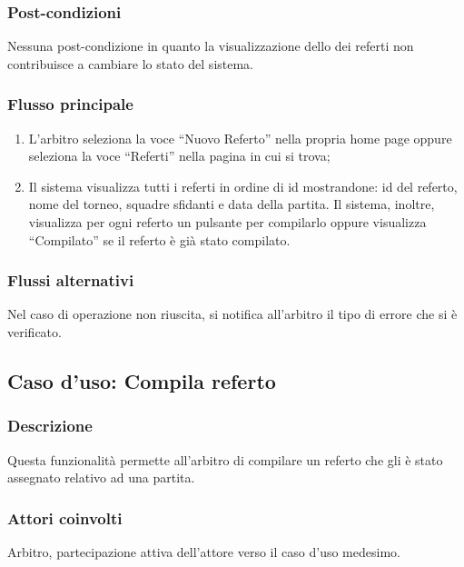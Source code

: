 \subsubsection*{Post-condizioni}
Nessuna post-condizione in quanto la visualizzazione dello dei referti non contribuisce a cambiare lo stato del sistema.

\subsubsection*{Flusso principale}

\begin{enumerate}
	
	\item
	L'arbitro seleziona la voce ``Nuovo Referto'' nella propria home page oppure seleziona la voce ``Referti'' nella pagina in cui si trova;
	
	\item
	Il sistema visualizza tutti i referti in ordine di id mostrandone: id del referto, nome del torneo, squadre sfidanti e data della partita. Il sistema, inoltre, visualizza per ogni referto un pulsante per compilarlo oppure visualizza ``Compilato'' se il referto è già stato compilato. 
	
\end{enumerate}

\subsubsection*{Flussi alternativi}
Nel caso di operazione non riuscita, si notifica all'arbitro il tipo di errore che si è verificato.


%
%
\subsection{Caso d'uso: Compila referto}

\subsubsection*{Descrizione}
Questa funzionalità permette all'arbitro di compilare un referto che gli è stato assegnato relativo ad una partita.

\subsubsection*{Attori coinvolti}
Arbitro, partecipazione attiva dell'attore verso il caso d'uso medesimo.

